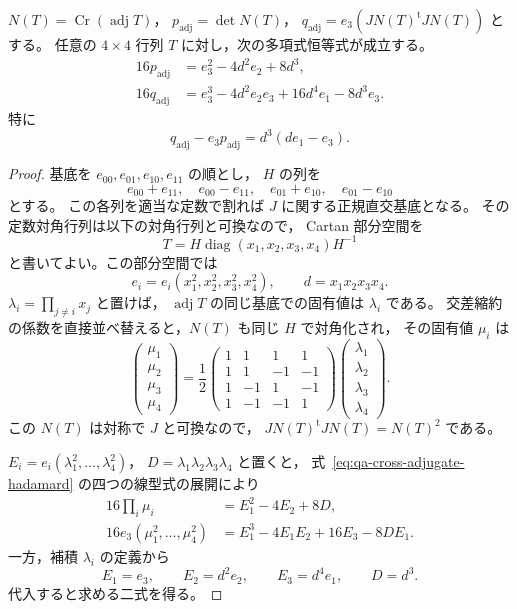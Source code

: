 \begin{proposition}[二半不変式の普遍恒等式]
\label{prop:qa-cubic-adjugate-explicit-invariants}
$N(T)=\operatorname{Cr}(\operatorname{adj}T)$，
$p_{\mathrm{adj}}=\det N(T)$，
$q_{\mathrm{adj}}=e_3(JN(T)^{\mathrm t}JN(T))$ とする。
任意の $4\times4$ 行列 $T$ に対し，次の多項式恒等式が成立する。
\[
 \begin{split}
 16p_{\mathrm{adj}}
   &=e_3^2-4d^2e_2+8d^3,\\
 16q_{\mathrm{adj}}
   &=e_3^3-4d^2e_2e_3+16d^4e_1-8d^3e_3.
 \end{split}
 \tag{CPQ}\label{eq:qa-cubic-adjugate-pq-formulas}
\]
特に
\[
 q_{\mathrm{adj}}-e_3p_{\mathrm{adj}}
     =d^3(de_1-e_3).
 \tag{CPQ-diff}\label{eq:qa-cubic-adjugate-pq-difference}
\]
\end{proposition}
\begin{proof}
基底を $e_{00},e_{01},e_{10},e_{11}$ の順とし，
$H$ の列を
\[
 e_{00}+e_{11},\quad e_{00}-e_{11},\quad
 e_{01}+e_{10},\quad e_{01}-e_{10}
\]
とする。
この各列を適当な定数で割れば $J$ に関する正規直交基底となる。
その定数対角行列は以下の対角行列と可換なので，
Cartan 部分空間を
\[
 T=H\operatorname{diag}(x_1,x_2,x_3,x_4)H^{-1}
\]
と書いてよい。この部分空間では
\[
 e_i=e_i(x_1^2,x_2^2,x_3^2,x_4^2),\qquad
 d=x_1x_2x_3x_4 .
\]
$\lambda_i=\prod_{j\ne i}x_j$ と置けば，
$\operatorname{adj}T$ の同じ基底での固有値は $\lambda_i$ である。
交差縮約の係数を直接並べ替えると，$N(T)$ も同じ $H$ で対角化され，
その固有値 $\mu_i$ は
\[
 \begin{pmatrix}\mu_1\\\mu_2\\\mu_3\\\mu_4\end{pmatrix}
 =
 \frac12
 \begin{pmatrix}
 1&1&1&1\\
 1&1&-1&-1\\
 1&-1&1&-1\\
 1&-1&-1&1
 \end{pmatrix}
 \begin{pmatrix}\lambda_1\\\lambda_2\\\lambda_3\\\lambda_4\end{pmatrix}.
 \tag{CH}\label{eq:qa-cross-adjugate-hadamard}
\]
この $N(T)$ は対称で $J$ と可換なので，
$JN(T)^{\mathrm t}JN(T)=N(T)^2$ である。

$E_i=e_i(\lambda_1^2,\ldots,\lambda_4^2)$，
$D=\lambda_1\lambda_2\lambda_3\lambda_4$ と置くと，
式~\eqref{eq:qa-cross-adjugate-hadamard} の四つの線型式の展開により
\[
 \begin{split}
 16\prod_i\mu_i&=E_1^2-4E_2+8D,\\
 16e_3(\mu_1^2,\ldots,\mu_4^2)
     &=E_1^3-4E_1E_2+16E_3-8DE_1.
 \end{split}
\]
一方，補積 $\lambda_i$ の定義から
\[
 E_1=e_3,\qquad E_2=d^2e_2,\qquad
 E_3=d^4e_1,\qquad D=d^3 .
\]
代入すると求める二式を得る。


\end{proof}
